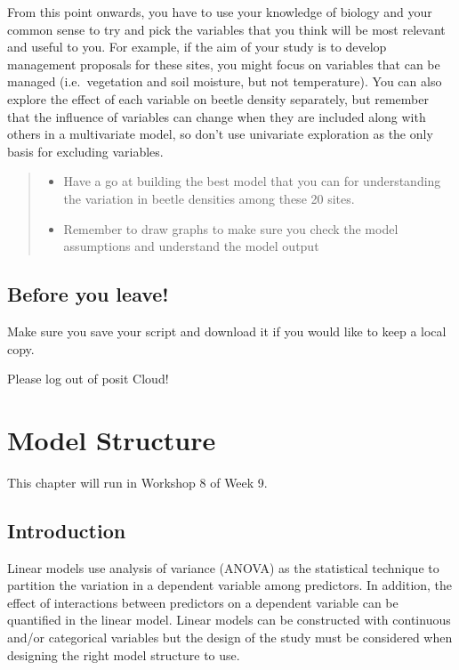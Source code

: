 \documentclass[
]{book}
\providecommand{\tightlist}{%
  \setlength{\itemsep}{0pt}\setlength{\parskip}{0pt}}
\begin{document}
From this point onwards, you have to use your knowledge of biology and your common sense to try and pick the variables that you think will be most relevant and useful to you. For example, if the aim of your study is to develop management proposals for these sites, you might focus on variables that can be managed (i.e.~vegetation and soil moisture, but not temperature). You can also explore the effect of each variable on beetle density separately, but remember that the influence of variables can change when they are included along with others in a multivariate model, so don't use univariate exploration as the only basis for excluding variables.

\begin{quote}
\begin{itemize}
\tightlist
\item
  Have a go at building the best model that you can for understanding the variation in beetle densities among these 20 sites.
\item
  Remember to draw graphs to make sure you check the model assumptions and understand the model output
\end{itemize}
\end{quote}

\hypertarget{before-you-leave-8}{%
\section{Before you leave!}\label{before-you-leave-8}}

Make sure you save your script and download it if you would like to keep a local copy.

Please log out of posit Cloud!

\hypertarget{model-structure}{%
\chapter{Model Structure}\label{model-structure}}

This chapter will run in Workshop 8 of Week 9.

\hypertarget{introduction-6}{%
\section{Introduction}\label{introduction-6}}

Linear models use analysis of variance (ANOVA) as the statistical technique to partition the variation in a dependent variable among predictors. In addition, the effect of interactions between predictors on a dependent variable can be quantified in the linear model. Linear models can be constructed with continuous and/or categorical variables but the design of the study must be considered when designing the right model structure to use.
\end{document}
